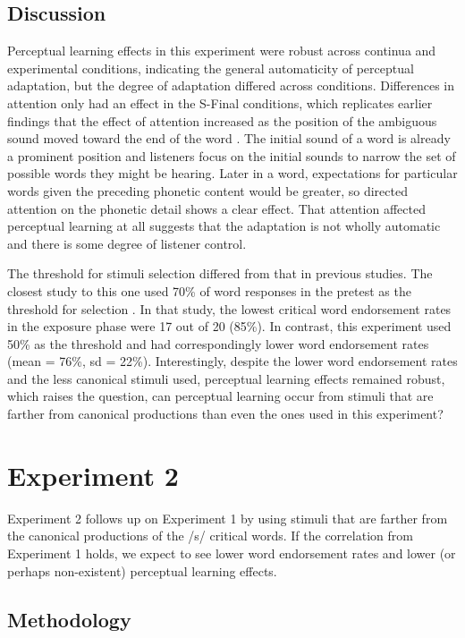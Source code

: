 \subsection{Discussion}

Perceptual learning effects in this experiment were robust across continua and experimental conditions, indicating the general automaticity of perceptual adaptation, but the degree of adaptation differed across conditions. 
Differences in attention only had an effect in the S-Final conditions, which replicates earlier findings that the effect of attention increased as the position of the ambiguous sound moved toward the end of the word \cite{Pitt2012}.  
The initial sound of a word is already a prominent position and listeners focus on the initial sounds to narrow the set of possible words they might be hearing. Later in a word, expectations for particular words given the preceding phonetic content would be greater, so directed attention on the phonetic detail shows a clear effect.  
That attention affected perceptual learning at all suggests that the adaptation is not wholly automatic and there is some degree of listener control.

The threshold for stimuli selection differed from that in previous studies. The closest study to this one used 70\% of word responses in the pretest as the threshold for selection \citep{Reinisch2013}.  In that study, the lowest critical word endorsement rates in the exposure phase were 17 out of 20 (85\%).  In contrast, this experiment used 50\% as the threshold and had correspondingly lower word endorsement rates (mean = 76\%, sd = 22\%).  Interestingly, despite the lower word endorsement rates and the less canonical stimuli used, perceptual learning effects remained robust, which raises the question, can perceptual learning occur from stimuli that are farther from canonical productions than even the ones used in this experiment?

\section{Experiment 2}

Experiment 2 follows up on Experiment 1 by using stimuli that are farther from the canonical productions of the /s/ critical words.  If the correlation from Experiment 1 holds, we expect to see lower word endorsement rates and lower (or perhaps non-existent) perceptual learning effects.

\subsection{Methodology}


